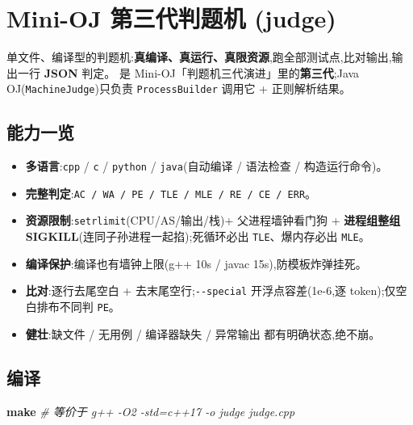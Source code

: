 \documentclass[
  11pt,
]{ctexart}
\newenvironment{Shaded}{\begin{snugshade}}{\end{snugshade}}
\newcommand{\CommentTok}[1]{\textcolor[rgb]{0.56,0.35,0.01}{\textit{#1}}}
\newcommand{\FunctionTok}[1]{\textcolor[rgb]{0.13,0.29,0.53}{\textbf{#1}}}
\providecommand{\tightlist}{%
  \setlength{\itemsep}{0pt}\setlength{\parskip}{0pt}}
\begin{document}
\hypertarget{mini-oj-ux7b2cux4e09ux4ee3ux5224ux9898ux673a-judge}{%
\section{Mini-OJ 第三代判题机
(judge)}\label{mini-oj-ux7b2cux4e09ux4ee3ux5224ux9898ux673a-judge}}

单文件、编译型的判题机:\textbf{真编译、真运行、真限资源},跑全部测试点,比对输出,输出一行
\textbf{JSON} 判定。 是
Mini-OJ「判题机三代演进」里的\textbf{第三代};Java
OJ(\texttt{MachineJudge})只负责 \texttt{ProcessBuilder} 调用它 +
正则解析结果。

\hypertarget{ux80fdux529bux4e00ux89c8}{%
\subsection{能力一览}\label{ux80fdux529bux4e00ux89c8}}

\begin{itemize}
\tightlist
\item
  \textbf{多语言}:\texttt{cpp} / \texttt{c} / \texttt{python} /
  \texttt{java}(自动编译 / 语法检查 / 构造运行命令)。
\item
  \textbf{完整判定}:\texttt{AC\ /\ WA\ /\ PE\ /\ TLE\ /\ MLE\ /\ RE\ /\ CE\ /\ ERR}。
\item
  \textbf{资源限制}:\texttt{setrlimit}(CPU/AS/输出/栈)+ 父进程墙钟看门狗
  + \textbf{进程组整组 SIGKILL}(连同子孙进程一起掐);死循环必出
  \texttt{TLE}、爆内存必出 \texttt{MLE}。
\item
  \textbf{编译保护}:编译也有墙钟上限(g++ 10s / javac
  15s),防模板炸弹挂死。
\item
  \textbf{比对}:逐行去尾空白 + 去末尾空行;\texttt{-\/-special}
  开浮点容差(1e-6,逐 token);仅空白排布不同判 \texttt{PE}。
\item
  \textbf{健壮}:缺文件 / 无用例 / 编译器缺失 / 异常输出
  都有明确状态,绝不崩。
\end{itemize}

\hypertarget{ux7f16ux8bd1}{%
\subsection{编译}\label{ux7f16ux8bd1}}

\begin{Shaded}
\begin{Highlighting}[]
\FunctionTok{make}            \CommentTok{\# 等价于 g++ {-}O2 {-}std=c++17 {-}o judge judge.cpp}
\end{Highlighting}
\end{Shaded}
\end{document}
